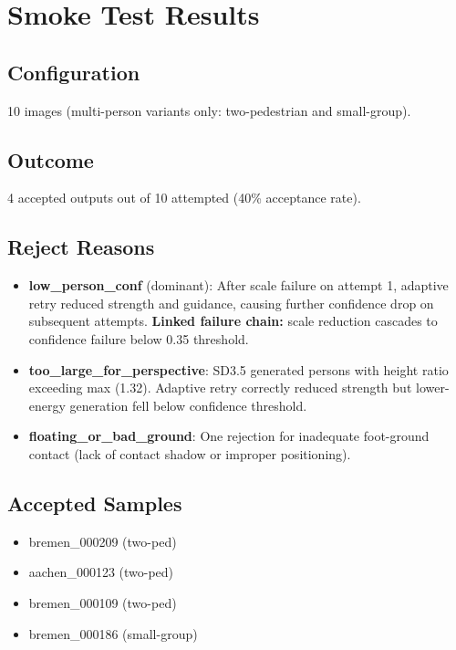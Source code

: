 \documentclass[12pt,a4paper]{article}
\begin{document}
\section{Smoke Test Results}

\subsection{Configuration}
10 images (multi-person variants only: two-pedestrian and small-group).

\subsection{Outcome}
4 accepted outputs out of 10 attempted (40\% acceptance rate).

\subsection{Reject Reasons}
\begin{itemize}
    \item \textbf{low\_person\_conf} (dominant): After scale failure on attempt 1, adaptive retry reduced strength and guidance, causing further confidence drop on subsequent attempts. \textbf{Linked failure chain:} scale reduction cascades to confidence failure below 0.35 threshold.

    \item \textbf{too\_large\_for\_perspective}: SD3.5 generated persons with height ratio exceeding max (1.32). Adaptive retry correctly reduced strength but lower-energy generation fell below confidence threshold.

    \item \textbf{floating\_or\_bad\_ground}: One rejection for inadequate foot-ground contact (lack of contact shadow or improper positioning).
\end{itemize}

\subsection{Accepted Samples}
\begin{itemize}
    \item bremen\_000209 (two-ped)
    \item aachen\_000123 (two-ped)
    \item bremen\_000109 (two-ped)
    \item bremen\_000186 (small-group)
\end{itemize}
\end{document}
